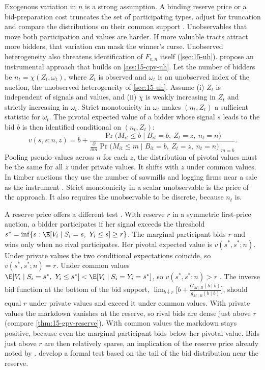  Exogenous variation in $n$ is a strong assumption. A binding reserve price
or a bid-preparation cost truncates the set of participating types. \citet{HaileHongShum2003} adjust for
truncation and compare the distributions on their common support \citep[Section~8.2]{AtheyHaile2007}.
Unobservables that move both participation and values are harder. If more valuable tracts attract more bidders,
that variation can mask the winner's curse. Unobserved heterogeneity also threatens identification of $F_{v,n}$
itself (\cref{sec:15-uh}). \citet{HaileHongShum2003} propose an instrumental approach that builds on
\cref{ass:15-cpv-uh}. Let the number of bidders be $n_t=\chi(Z_t,\omega_t)$, where $Z_t$ is observed and
$\omega_t$ is an unobserved index of the auction, the unobserved heterogeneity of \cref{sec:15-uh}. Assume
(i) $Z_t$ is independent of signals and values, and (ii) $\chi$ is weakly increasing in $Z_t$ and strictly
increasing in $\omega_t$. Strict monotonicity in $\omega_t$ makes $(n_t,Z_t)$ a sufficient statistic for
$\omega_t$. The pivotal expected value of a bidder whose signal $s$ leads to the bid $b$ is then identified
conditional on $(n_t,Z_t)$:
\begin{equation*}
  v(s,s;n,z)=b+\frac{\Pr\bigl(M_{it}\le b\mid B_{it}=b,\ Z_t=z,\ n_t=n\bigr)}{\frac{\partial}{\partial m}
  \Pr\bigl(M_{it}\le m\mid B_{it}=b,\ Z_t=z,\ n_t=n\bigr)\big|_{m=b}} .
\end{equation*}
Pooling pseudo-values across $n$ for each $z$, the distribution of pivotal values must be the same for all $z$
under private values. It shifts with $z$ under common values. In timber auctions they use the number of
sawmills and logging firms near a sale as the instrument \citep[Section~8.2]{AtheyHaile2007}. Strict
monotonicity in a scalar unobservable is the price of the approach. It also requires the unobservable to be
discrete, because $n_t$ is.

 A reserve price offers a different test \citep{HendricksPinksePorter2003}.
With reserve $r$ in a symmetric first-price auction, a bidder participates if her signal exceeds the threshold
$s^\ast=\inf\{s:\E[V_i\mid S_i=s,\ Y_i\le s]\ge r\}$. The marginal participant bids $r$ and wins only when no rival
participates. Her pivotal expected value is $v(s^\ast,s^\ast;n)$. Under private values the two conditional
expectations coincide, so $v(s^\ast,s^\ast;n)=r$. Under common values
$\E[V_i\mid S_i=s^\ast,\ Y_i\le s^\ast]<\E[V_i\mid S_i=Y_i=s^\ast]$, so $v(s^\ast,s^\ast;n)>r$
\citep[eqs.~(8.7)--(8.8)]{AtheyHaile2007}. The inverse bid function at the bottom of the bid support,
$\lim_{b\downarrow r}\bigl[b+\frac{G_{M\mid B}(b\mid b)}{g_{M\mid B}(b\mid b)}\bigr]$, should equal $r$ under
private values and exceed it under common values. With private values the markdown vanishes at the reserve,
so rival bids are dense just above $r$ (compare \cref{thm:15-gpv-reserve}). With common values the markdown
stays positive, because even the marginal participant bids below her pivotal value. Bids just above $r$ are
then relatively sparse, an implication of the reserve price already noted by \citet{MilgromWeber1982}.
\citet{HillShneyerov2013} develop a formal test based on the tail of the bid distribution near the reserve.

